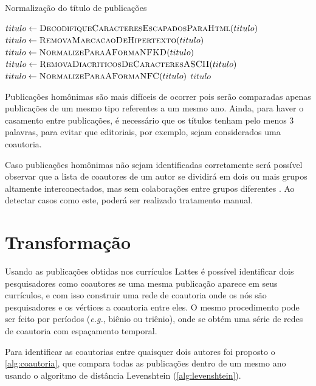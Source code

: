 \begin{algorithm}
\caption{Normalização do título de publicações}
\label{alg:normalizacao}
\begin{algorithmic}[1]

\State $titulo\gets \Call{DecodifiqueCaracteresEscapadosParaHtml}{titulo}$
\State $titulo\gets \Call{RemovaMarcacaoDeHipertexto}{titulo}$
\State $titulo\gets \Call{NormalizeParaAFormaNFKD}{titulo}$
\State $titulo\gets \Call{RemovaDiacriticosDeCaracteresASCII}{titulo}$
\State $titulo\gets \Call{NormalizeParaAFormaNFC}{titulo}$
\State \Return $titulo$
\EndProcedure

\end{algorithmic}
\end{algorithm}

Publicações homônimas são mais difíceis de ocorrer pois serão comparadas apenas publicações de um mesmo tipo referentes a um mesmo ano. Ainda, para haver o casamento entre publicações, é necessário que os títulos tenham pelo menos 3 palavras, para evitar que editoriais, por exemplo, sejam considerados uma coautoria.

Caso publicações homônimas não sejam identificadas corretamente será possível observar que a lista de coautores de um autor se dividirá em dois ou mais grupos altamente interconectados, mas sem colaborações entre grupos diferentes \cite{franceschet2011collaboration}. Ao detectar casos como este, poderá ser realizado tratamento manual.

\section{Transformação}

Usando as publicações obtidas nos currículos Lattes é possível identificar dois pesquisadores como coautores se uma mesma publicação aparece em seus currículos, e com isso construir uma rede de coautoria onde os nós são pesquisadores e os vértices a coautoria entre eles. O mesmo procedimento pode ser feito por períodos (\textit{e.g.}, biênio ou triênio), onde se obtém uma série de redes de coautoria com espaçamento temporal.

Para identificar as coautorias entre quaisquer dois autores foi proposto o \autoref{alg:coautoria}, que compara todas as publicações dentro de um mesmo ano usando o algoritmo de distância Levenshtein (\autoref{alg:levenshtein}).

